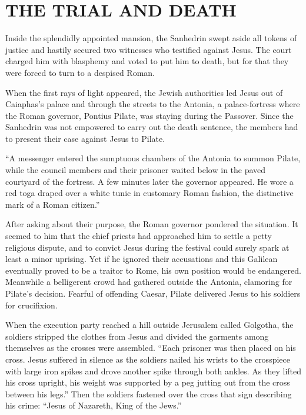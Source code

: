 \section{THE TRIAL AND DEATH}

Inside the splendidly appointed mansion, the Sanhedrin swept aside all tokens of justice and hastily
secured two witnesses who testified against Jesus. The court charged him with blasphemy and voted to
put him to death, but for that they were forced to turn to a despised Roman.

When the first rays of light appeared, the Jewish authorities led Jesus out of Caiaphas’s palace and
through the streets to the Antonia, a palace-fortress where the Roman governor, Pontius Pilate, was
staying during the Passover. Since the Sanhedrin was not empowered to carry out the death sentence,
the members had to present their case against Jesus to Pilate.

“A messenger entered the sumptuous chambers of the Antonia to summon Pilate, while the council
members and their prisoner waited below in the paved courtyard of the fortress. A few minutes later
the governor appeared. He wore a red toga draped over a white tunic in customary Roman fashion, the
distinctive mark of a Roman citizen.”

After asking about their purpose, the Roman governor pondered the situation. It seemed to him that
the chief priests had approached him to settle a petty religious dispute, and to convict Jesus
during the festival could surely spark at least a minor uprising. Yet if he ignored their
accusations and this Galilean eventually proved to be a traitor to Rome, his own position would be
endangered. Meanwhile a belligerent crowd had gathered outside the Antonia, clamoring for Pilate’s
decision. Fearful of offending Caesar, Pilate delivered Jesus to his soldiers for crucifixion.

When the execution party reached a hill outside Jerusalem called Golgotha, the soldiers stripped the
clothes from Jesus and divided the garments among themselves as the crosses were assembled. “Each
prisoner was then placed on his cross. Jesus suffered in silence as the soldiers nailed his wrists
to the crosspiece with large iron spikes and drove another spike through both ankles. As they lifted
his cross upright, his weight was supported by a peg jutting out from the cross between his legs.”
Then the soldiers fastened over the cross that sign describing his crime: “Jesus of Nazareth, King
of the Jews.”

